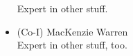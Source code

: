 \documentclass[12pt,letterpaper,english]{article}
\begin{document}
\begin{itemize}
Expert in other stuff.
\item (Co-I) MacKenzie Warren \\
Expert in other stuff, too.

\end{itemize}
\end{document}
